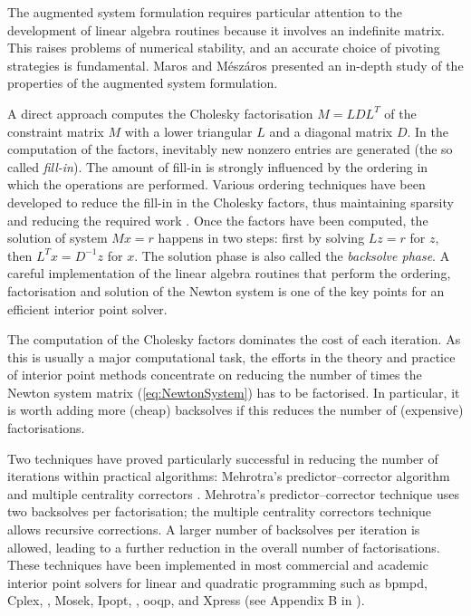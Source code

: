 The augmented system formulation requires particular attention 
to the development of linear algebra routines because
it involves an indefinite matrix. This raises problems of numerical
stability, and an accurate choice of pivoting strategies is fundamental.
Maros and M\'esz\'aros \cite{MarosMeszaros} presented an in-depth 
study of the properties of the augmented system formulation.

A direct approach computes the Cholesky factorisation $M=LDL^T$
of the constraint matrix $M$ with a lower triangular $L$ and
a diagonal matrix $D$.
In the computation of the factors, inevitably new nonzero entries
are generated (the so called {\em fill-in}). The amount of
fill-in is strongly influenced by the ordering in which the
operations are performed.
Various ordering techniques have been developed to reduce the fill-in
in the Cholesky factors, thus maintaining sparsity and 
reducing the required work \cite{RothbergHendrickson}.
Once the factors have been computed, the solution of system $Mx = r$ 
happens in two steps:
first by solving $Lz = r$ for $z$, then $L^Tx = D^{-1}z$ for $x$.
The solution phase is also called the {\em backsolve phase}.
A careful implementation of the linear algebra routines that perform
the ordering, factorisation and solution of the Newton system is
one of the key points for an efficient interior point solver.

The computation of the Cholesky factors
dominates the cost of each iteration.
As this is usually a major computational task, 
the efforts in the theory and practice of 
interior point methods concentrate on reducing 
the number of times the Newton system matrix (\ref{eq:NewtonSystem}) 
has to be factorised.
In particular, it is worth adding more (cheap) 
backsolves if this reduces the number of (expensive) factorisations. 

Two techniques have proved particularly successful in reducing 
the number of iterations within practical algorithms:
Mehrotra's predictor--corrector algorithm \cite{Mehrotra92} 
and multiple centrality correctors \cite{Gondzio96}. 
Mehrotra's predictor--corrector technique \cite{Mehrotra92} uses two 
backsolves per factorisation; the multiple centrality correctors technique
\cite{Gondzio96} allows recursive corrections. A larger number 
of backsolves per iteration is allowed, leading to a further reduction 
in the overall number of factorisations. 
These 
techniques have been implemented in most commercial and academic 
interior point solvers for linear and quadratic programming such 
as {\sc bpmpd}, Cplex, \HOPDM, Mosek, Ipopt, \OOPS, {\sc ooqp}, \PCx and Xpress
(see Appendix B in \cite{ipm:Wright97}).


